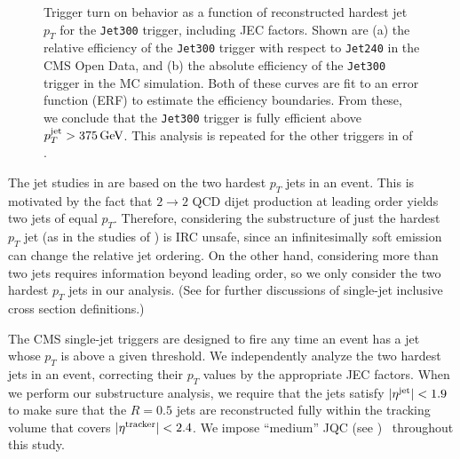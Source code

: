 \documentclass[aps,prd,twocolumn,preprintnumbers,nofootinbib,longbibliography,floatfix,superscriptaddress]{revtex4-1}
\begin{document}
\begin{figure*}[p]
\centering
\caption{
Trigger turn on behavior as a function of reconstructed hardest jet $p_T$ for the \texttt{Jet300} trigger, including JEC factors.
%
Shown are (a) the relative efficiency of the \texttt{Jet300} trigger with respect to \texttt{Jet240} in the CMS Open Data, and (b) the absolute efficiency of the \texttt{Jet300} trigger in the MC simulation.
%
Both of these curves are fit to an error function (ERF) to estimate the efficiency boundaries.
%
From these, we conclude that the \texttt{Jet300} trigger is fully efficient above $p^{\rm jet}_T > \SI{375}{GeV}$.
%
This analysis is repeated for the other triggers in  of .
}
\label{fig:trigger_turn_on_sim}
\end{figure*}


The jet studies in  are based on the two hardest $p_T$ jets in an event.
%
This is motivated by the fact that $2 \to 2$ QCD dijet production at leading order yields two jets of equal $p_T$.
%
Therefore, considering the substructure of just the hardest $p_T$ jet (as in the studies of ) is IRC unsafe, since an infinitesimally soft emission can change the relative jet ordering.
%
On the other hand, considering more than two jets requires information beyond leading order, so we only consider the two hardest $p_T$ jets in our analysis.
%
(See  for further discussions of single-jet inclusive cross section definitions.)


The CMS single-jet triggers are designed to fire any time an event has a jet whose $p_T$ is above a given threshold.
%
We independently analyze the two hardest jets in an event, correcting their $p_T$ values by the appropriate JEC factors.
%
When we perform our substructure analysis, we require that the jets satisfy $|\eta^{\rm jet}| < 1.9$ to make sure that the $R = 0.5$ jets are reconstructed fully within the tracking volume that covers $|\eta^{\rm tracker}| < 2.4$.
%
We impose ``medium'' JQC (see )~\cite{CMS:2010xta,2011JInst...611002C} throughout this study.
\end{document}
